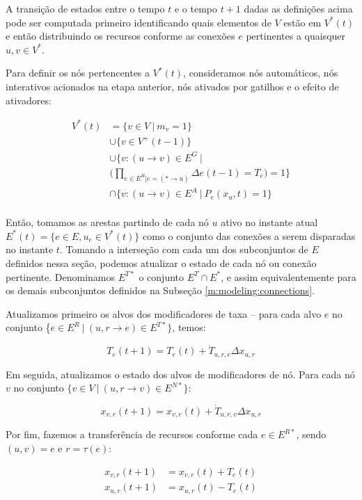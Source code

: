 \documentclass[10pt,a4paper]{article}
\begin{document}
A transição de estados entre o tempo $t$ e o tempo $t+1$ dadas as definições acima pode ser computada primeiro identificando quais elementos de $V$ estão em $V^*(t)$ e então distribuindo os recursos conforme as conexões $e$ pertinentes a quaisquer $u,v \in V^*$.

Para definir os nós pertencentes a $V^*(t)$, consideramos nós automáticos, nós interativos acionados na etapa anterior, nós ativados por gatilhos e o efeito de ativadores:

\begin{align*}
    V^*(t) &= \{v \in V \ | \ m_v = 1\}\\& \cup \{v \in V^+(t-1)\}\\
    & \cup \{v: (u \rightarrow v) \in E^G\ | \\\
    &(\prod_{e \in E^R | e = (* \rightarrow u)}{\Delta e(t-1) = T_e)} = 1 \}\\
    &\cap \{v: (u \rightarrow v) \in E^A\ | \ P_e(x_u, t) = 1 \}\\
\end{align*}

Então, tomamos as arestas partindo de cada nó $u$ ativo no instante atual $E^*(t) = \{e \in E, u_e \in V^*(t)\}$ como o conjunto das conexões a serem disparadas no instante $t$. Tomando a interseção com cada um dos subconjuntos de $E$ definidos nessa seção, podemos atualizar o estado de cada nó ou conexão pertinente. Denominamos $E^{T*}$ o conjunto $E^T \cap E^*$, e assim equivalentemente para os demais subconjuntos definidos na Subseção \ref{m:modeling:connections}.

Atualizamos primeiro os alvos dos modificadores de taxa -- para cada alvo $e$ no conjunto \{$e \in E^R \ | \ (u, r \rightarrow e) \in E^{T*}\}$, temos:

$$
T_{e}(t+1) = T_{e}(t) + \dot{T}_{u,r,e} \Delta x_{u,r}
$$

Em seguida, atualizamos o estado dos alvos de modificadores de nó. Para cada nó $v$ no conjunto $\{v \in V \ | \ (u, r \rightarrow v) \in E^{N*}\}$:

$$
x_{v, r}(t+1) = x_{v, r}(t) + \dot{T}_{u,r,v} \Delta x_{u,r}
$$

Por fim, fazemos a transferência de recursos conforme cada $e \in E^{R*}$, sendo $(u, v) = e$ e $r = \tau(e)$:

\begin{align*}
    x_{v, r}(t+1) &= x_{v,r}(t) + T_e(t)\\
    x_{u, r}(t+1) &= x_{u,r}(t) - T_e(t)\\
\end{align*}
\end{document}
